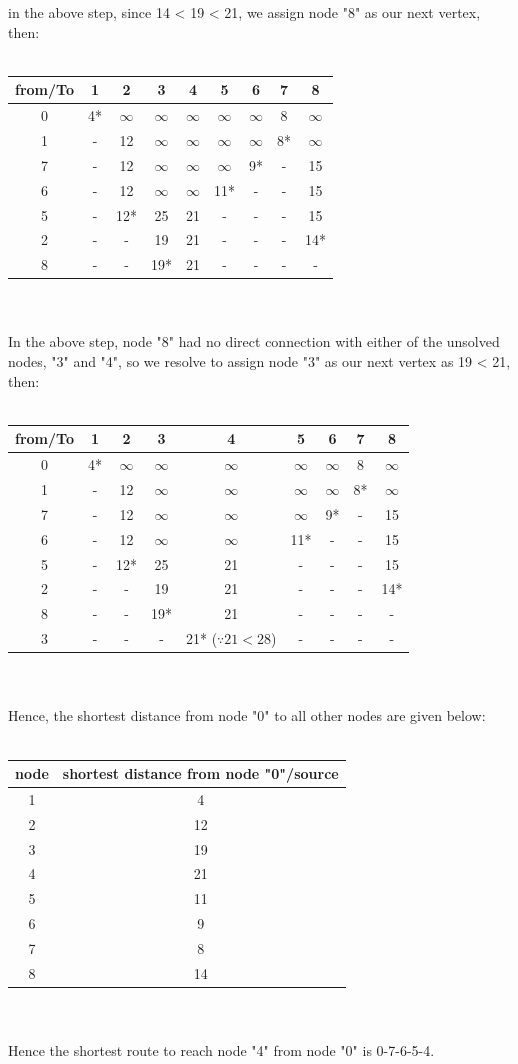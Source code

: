 in the above step, since 14 < 19 < 21, we assign node "8" as our next vertex, then:\\\\
\begin{tabular}{c | c| c| c| c| c| c| c| c}
	from/To & 1 & 2 & 3 & 4 & 5 & 6 & 7 & 8 \\
	\hline
	0 & 4* & $\infty$ & $\infty$& $\infty$& $\infty$& $\infty$ & 8 & $\infty$\\
	1 & - & 12 & $\infty$& $\infty$& $\infty$& $\infty$ & 8* & $\infty$\\
	7 & - & 12 & $\infty$& $\infty$& $\infty$& 9* & - & 15\\
	6 & - & 12 & $\infty$& $\infty$& 11* & - & - & 15 \\
	5 & - & 12* & 25 & 21 & - & - & - & 15 \\
	2 & - & - & 19 & 21 & - & - & - & 14*\\
	8 & - & - & 19* & 21 & - & - & - & -\\
\end{tabular}\\\\
In the above step, node "8" had no direct connection with either of the unsolved nodes, "3" and "4", so we resolve to assign node "3" as our next vertex as 19 < 21, then:\\\\
\begin{tabular}{c | c| c| c| c| c| c| c| c}
	from/To & 1 & 2 & 3 & 4 & 5 & 6 & 7 & 8 \\
	\hline
	0 & 4* & $\infty$ & $\infty$& $\infty$& $\infty$& $\infty$ & 8 & $\infty$\\
	1 & - & 12 & $\infty$& $\infty$& $\infty$& $\infty$ & 8* & $\infty$\\
	7 & - & 12 & $\infty$& $\infty$& $\infty$& 9* & - & 15\\
	6 & - & 12 & $\infty$& $\infty$& 11* & - & - & 15 \\
	5 & - & 12* & 25 & 21 & - & - & - & 15 \\
	2 & - & - & 19 & 21 & - & - & - & 14*\\
	8 & - & - & 19* & 21 & - & - & - & -\\
	3 & - & - & - & 21* ($\because 21 < 28$) & - & - & - & -\\
\end{tabular}\\\\
Hence, the shortest distance from node "0" to all other nodes are given below:\\\\
\begin{tabular}{c | c}
	\textbf{node} & \textbf{shortest distance from node "0"/source}\\
	\hline
	1 & 4\\
	2 & 12\\
	3 & 19\\
	4 & 21\\
	5 & 11\\
	6 & 9\\
	7 & 8\\
	8 & 14
\end{tabular}\\\\
Hence the shortest route to reach node "4" from node "0" is 0-7-6-5-4.
%
